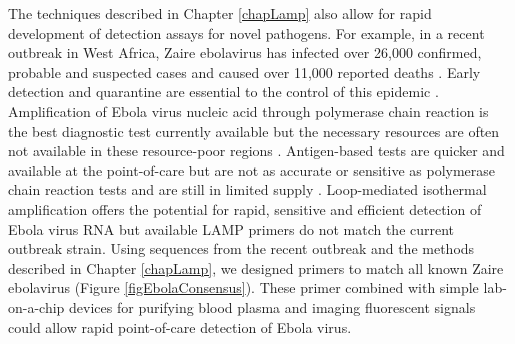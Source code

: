 \documentclass[../sherrill-Mix_thesis.tex]{subfiles}
\begin{document}
		The techniques described in Chapter \ref{chapLamp} also allow for rapid development of detection assays for novel pathogens. For example, in a recent outbreak in West Africa, Zaire ebolavirus has infected over 26,000 confirmed, probable and suspected cases and caused over 11,000 reported deaths \citep{Gire2014,WHOERT2014,WHO2015}. Early detection and quarantine are essential to the control of this epidemic \citep{Chowell2014}. Amplification of Ebola virus nucleic acid through polymerase chain reaction is the best diagnostic test currently available but the necessary resources are often not available in these resource-poor regions \citep{Fauci2014,WHO2015a}. Antigen-based tests are quicker and available at the point-of-care but are not as accurate or sensitive as polymerase chain reaction tests and are still in limited supply \citep{WHO2015a}.  Loop-mediated isothermal amplification offers the potential for rapid, sensitive and efficient detection of Ebola virus RNA but available LAMP primers \citep{Kurosaki2007} do not match the current outbreak strain. Using sequences from the recent outbreak \citep{Gire2014,Hoenen2015} and the methods described in Chapter \ref{chapLamp}, we designed primers to match all known Zaire ebolavirus (Figure \ref{figEbolaConsensus}). These primer combined with simple lab-on-a-chip devices for purifying blood plasma \citep{Liu2013} and imaging fluorescent signals \citep{Liu2011,Liu2014a} could allow rapid point-of-care detection of Ebola virus.
\end{document}
